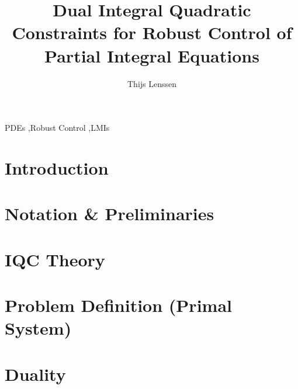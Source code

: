 \documentclass[final,5p,twocolumn]{elsarticle}
\begin{document}
\begin{frontmatter}

\title{Dual Integral Quadratic Constraints for Robust Control of Partial Integral Equations}

\author{Thijs Lenssen}
\address{Control Systems Group, Eindhoven University of Technology, The Netherlands}


\begin{abstract}

\end{abstract}

\begin{keyword}
PDEs \sep Robust Control \sep LMIs
\end{keyword}

\end{frontmatter}

\section{Introduction}


\section{Notation \& Preliminaries}


\section{IQC Theory}\label{sec:iqc-theory}


\section{Problem Definition (Primal System)}\label{sec:primal-controller-analysis}


\section{Duality}\label{sec:duality}\label{sec:dynamic-filtering-duality}

\end{document}
